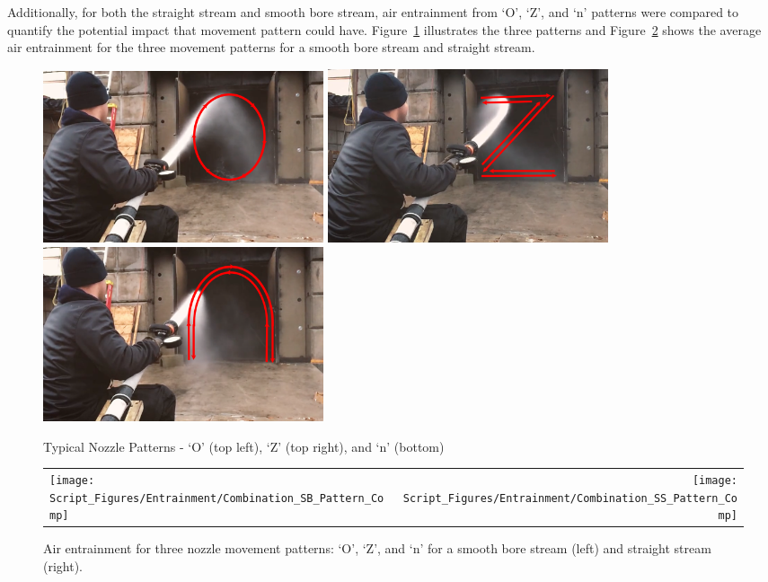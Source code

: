 \documentclass[12pt,oneside]{book}
\begin{document}
Additionally, for both the straight stream and smooth bore stream, air entrainment from `O', `Z', and `n' patterns were compared to quantify the potential impact that movement pattern could have. Figure~\ref{fig:O_Z_N_Pattern} illustrates the three patterns and Figure~\ref{fig:SS_SB_Movement_Comparison} shows the average air entrainment for the three movement patterns for a smooth bore stream and straight stream.

\begin{figure}[H]
\centering
\includegraphics[width=0.4\textwidth]{Figures/Air_Entrainment/O_Patern_Visual.png}
\includegraphics[width=0.4\textwidth]{Figures/Air_Entrainment/Z_Patern_Visual.png} \\
\includegraphics[width=0.4\textwidth]{Figures/Air_Entrainment/N_Patern_Visual.png}
\caption[Typical Nozzle Patterns]{Typical Nozzle Patterns - `O' (top left), `Z' (top right), and `n' (bottom)}
\label{fig:O_Z_N_Pattern}
\end{figure}

\begin{figure}[!ht]
\begin{tabular*}{\textwidth}{lr}
\texttt{[image: Script\_Figures/Entrainment/Combination\_SB\_Pattern\_Comp]} &
\texttt{[image: Script\_Figures/Entrainment/Combination\_SS\_Pattern\_Comp]} \\
\end{tabular*}
\caption[Air Entrainment Comparison of Movement Patterns]{Air entrainment for three nozzle movement patterns: `O', `Z', and `n' for a smooth bore stream (left) and straight stream (right).}
\label{fig:SS_SB_Movement_Comparison}
\end{figure}
\end{document}
